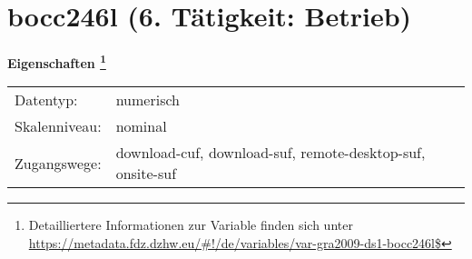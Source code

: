 
    \setcounter{footnote}{0}

    \vspace*{-1.8cm}
	\section{bocc246l (6. Tätigkeit: Betrieb)}
	\label{section:bocc246l}



    \vspace*{0.5cm}
    \noindent\textbf{Eigenschaften
	\footnote{Detailliertere Informationen zur Variable finden sich unter
		\url{https://metadata.fdz.dzhw.eu/\#!/de/variables/var-gra2009-ds1-bocc246l$}}}\\
	\begin{tabularx}{\hsize}{@{}lX}
	Datentyp: & numerisch \\
	Skalenniveau: & nominal \\
	Zugangswege: &
	  download-cuf, 
	  download-suf, 
	  remote-desktop-suf, 
	  onsite-suf
 \\
    \end{tabularx}



